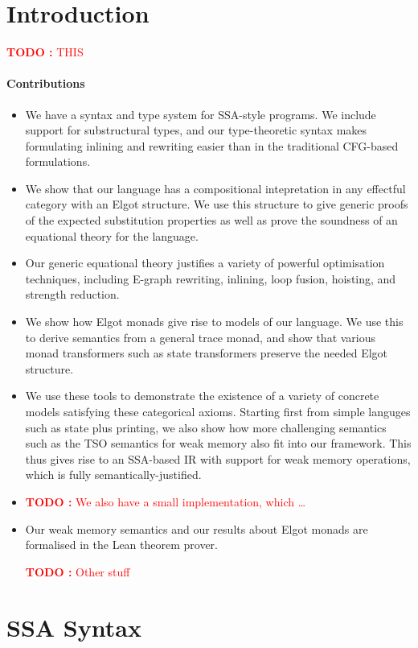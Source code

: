 \documentclass[acmsmall,screen,review]{acmart}
\newcounter{todos}
\newcommand{\TODO}[1]{{
  \stepcounter{todos}
  \begin{center}\large{\textcolor{red}{\textbf{TODO \arabic{todos}:} #1}}\end{center}
}}
\begin{document}
\section{Introduction}

\TODO{THIS}

\paragraph{Contributions}

\begin{itemize}
\item We have a syntax and type system for SSA-style programs. We include support for substructural types, and our type-theoretic syntax makes formulating inlining and rewriting easier than in the traditional CFG-based formulations. 
\item We show that our language has a compositional intepretation in any effectful category with an Elgot structure. We use this structure to give generic proofs of the expected substitution properties as well as prove the soundness of an equational theory for the language.
\item Our generic equational theory justifies a variety of powerful optimisation techniques, including E-graph rewriting, inlining, loop fusion, hoisting, and strength reduction. 
\item We show how Elgot monads give rise to models of our language. We use this to derive semantics from a general trace monad, and show that various monad transformers such as state transformers preserve the needed Elgot structure. 
\item We use these tools to demonstrate the existence of a variety of concrete models satisfying these categorical axioms. Starting first from simple languges such as state plus printing, we also show how more challenging semantics such as the TSO semantics for weak memory also fit into our framework. This thus gives rise to an SSA-based IR with support for weak memory operations, which is fully semantically-justified.
\item \TODO{We also have a small implementation, which \ldots}
\item Our weak memory semantics and our results about Elgot monads are formalised in the Lean theorem prover. \TODO{Other stuff}
\end{itemize}

\section{SSA Syntax}
\end{document}
